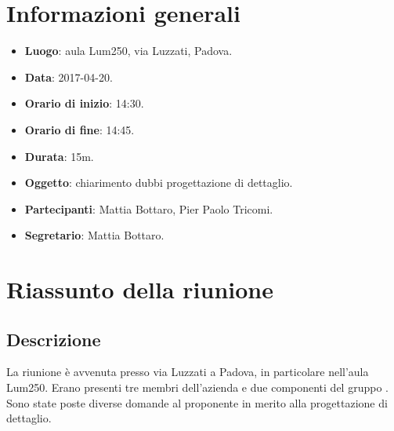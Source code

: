 \documentclass[a4paper,titlepage]{article}
\begin{document}
\maketitle
\begin{diario}
\end{diario}
\newpage
\tableofcontents

\newpage
\section{Informazioni generali}
\label{sec:Informazioni}

\begin{itemize}
  \item \textbf{Luogo}: aula Lum250, via Luzzati, Padova.
  \item \textbf{Data}: 2017-04-20.
  \item \textbf{Orario di inizio}: 14:30.
  \item \textbf{Orario di fine}: 14:45.
  \item \textbf{Durata}: 15m.
  \item \textbf{Oggetto}: chiarimento dubbi progettazione di dettaglio.
  \item \textbf{Partecipanti}: Mattia Bottaro, Pier Paolo Tricomi.
  \item \textbf{Segretario}: Mattia Bottaro.

\end{itemize}
\section{Riassunto della riunione}
\label{sec:RiassuntoRiunione}
 \subsection{Descrizione}
La riunione è avvenuta presso via Luzzati a Padova, in particolare nell'aula Lum250. Erano presenti tre membri dell'azienda  e due componenti del gruppo \GRUPPO{}. Sono state poste diverse domande al proponente in merito alla progettazione di dettaglio.
\end{document}

